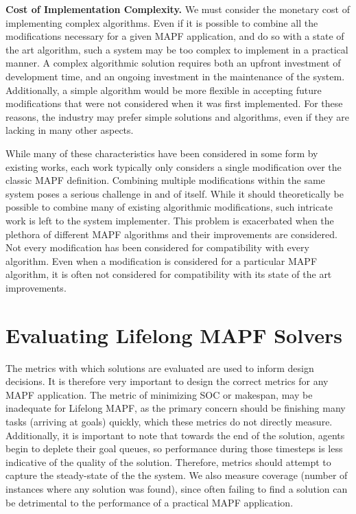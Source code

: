 \documentclass{article}
\newcommand{\soc}{SOC\xspace}
\newcommand{\mkspn}{makespan\xspace}
\newcommand{\lm}{Lifelong MAPF\xspace}
\begin{document}
\textbf{Cost of Implementation Complexity.} We must consider the monetary cost of implementing complex algorithms. Even if it is possible to combine all the modifications necessary for a given MAPF application, and do so with a state of the art algorithm, such a system may be too complex to implement in a practical manner. A complex algorithmic solution requires both an upfront investment of development time, and an ongoing investment in the maintenance of the system. Additionally, a simple algorithm would be more flexible in accepting future modifications that were not considered when it was first implemented. For these reasons, the industry may prefer simple solutions and algorithms, even if they are lacking in many other aspects.


While many of these characteristics have been considered in some form by existing works, each work typically only considers a single modification over the classic MAPF definition. Combining multiple modifications within the same system poses a serious challenge in and of itself. While it should theoretically be possible to combine many of existing algorithmic modifications, such intricate work is left to the system implementer. 
This problem is exacerbated when the plethora of different MAPF algorithms and their improvements are considered. Not every modification has been considered for compatibility with every algorithm. Even when a modification is considered for a particular MAPF algorithm, it is often not considered for compatibility with its state of the art improvements. 


\section{Evaluating \lm Solvers}

The metrics with which solutions are evaluated are used to inform design decisions. It is therefore very important to design the correct metrics for any MAPF application. 
The metric of minimizing \soc or \mkspn, may be inadequate for \lm, as the primary concern should be finishing many tasks (arriving at goals) quickly, which these metrics do not directly measure. Additionally, it is important to note that towards the end of the solution, agents begin to deplete their goal queues, so performance during those timesteps is less indicative of the quality of the solution. Therefore, metrics should attempt to capture the steady-state of the the system. We also measure coverage (number of instances where any solution was found), since often failing to find a solution can be detrimental to the performance of a practical MAPF application.
\end{document}
